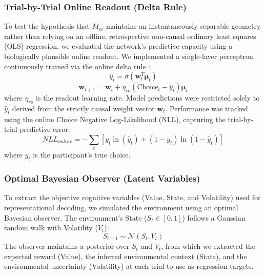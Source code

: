 \documentclass[12pt, a4paper]{extarticle}
\begin{document}
\subsubsection{Trial-by-Trial Online Readout (Delta Rule)}
To test the hypothesis that $M_{cc}$ maintains an instantaneously separable geometry rather than relying on an offline, retrospective non-causal ordinary least squares (OLS) regression, we evaluated the network's predictive capacity using a biologically plausible online readout. We implemented a single-layer perceptron continuously trained via the online delta rule \parencite{widrow1960adaptive}:
\begin{equation}
	\hat{y}_t = \sigma(\mathbf{w}_t^T \boldsymbol{\mu}_t)
\end{equation}
\begin{equation}
	\mathbf{w}_{t+1} = \mathbf{w}_t + \eta_{ro} (\text{Choice}_t - \hat{y}_t) \boldsymbol{\mu}_t
\end{equation}
where $\eta_{ro}$ is the readout learning rate. Model predictions were restricted solely to $\hat{y}_t$ derived from the strictly causal weight vector $\mathbf{w}_t$. Performance was tracked using the online Choice Negative Log-Likelihood (NLL), capturing the trial-by-trial predictive error:
\begin{equation}
NLL_{online} = -\sum_t \left[ y_t \ln(\hat{y}_t) + (1 - y_t) \ln(1 - \hat{y}_t) \right]
\end{equation}
where $y_t$ is the participant's true choice.

\subsubsection{Optimal Bayesian Observer (Latent Variables)}
To extract the objective cognitive variables (Value, State, and Volatility) used for representational decoding, we simulated the environment using an optimal Bayesian observer. The environment's State ($S_t \in [0,1]$) follows a Gaussian random walk with Volatility ($V_t$):
\begin{equation}
S_{t+1} \sim \mathcal{N}(S_t, V_t)
\end{equation}
The observer maintains a posterior over $S_t$ and $V_t$, from which we extracted the expected reward (Value), the inferred environmental context (State), and the environmental uncertainty (Volatility) at each trial to use as regression targets.
\end{document}
